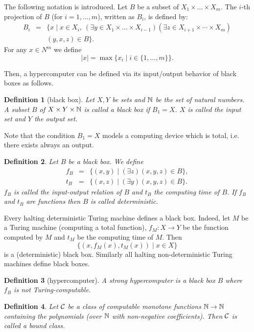 \documentclass[12pt]{article}
\newtheorem{definition}{{\bf Definition} }
\begin{document}
The following  notation is introduced. Let $B$ be a subset of $X_1 \times \ldots
\times X_m$. The $i$-th projection of $B$ (for $i=1,\ldots , m$),
written as $B_i$, is defined by:
%
\[
\begin{array}{lcl}
B_i &=& \{x \mid x \in X_i, \ (\exists y \in X_1 \times \ldots
\times X_{i-1})(\exists z \in X_{i+1} \times \cdots \times X_m)\\
& & (y,x,z) \in B\}.
\end{array}
\]
For any $x \in N^m$ we define
$$|x| = \max\{x_i \mid i \in \{1,\ldots,m\}\}.$$

Then, a hypercomputer can be defined via its input/output behavior of black boxes as follows.

\begin{definition}[black box]\label{def.blackb}
Let $X,Y$ be sets and ${\Bbb N}$ be the set of natural numbers. A subset
$B$ of $X \times Y \times {\Bbb N}$ is called a {\em black box} if $B_1
= X$. $X$ is called the {\em input set} and $Y$ the {\em output
set.}
\end{definition}
Note that the condition $B_1 = X$ models a computing device
which is total, i.e. there exists always an output.
%
\begin{definition}
Let $B$ be a black box. We define
%
\begin{eqnarray*}
f_B &=& \{(x,y) \mid (\exists z)(x,y,z) \in B\},\\[1ex]
%
t_B &=& \{(x,z) \mid (\exists y)(x,y,z) \in B\}.
\end{eqnarray*}
%
$f_B$ is called the {\em input-output relation} of $B$ and $t_B$
the {\em computing time} of $B$. If $f_B$ and $t_B$ are functions
then $B$ is called deterministic.
\end{definition}
Every halting deterministic Turing machine defines a
black box. Indeed, let $M$ be a Turing machine (computing a total
function), $f_M\colon X \to Y$ be the function computed by $M$ and
$t_M$ be the computing time of $M$. Then
$$\{(x,f_M(x),t_M(x)) \mid x \in X\}$$
is a (deterministic) black box. Similarly all halting
non-deterministic Turing machines define black boxes.


\begin{definition}[hypercomputer]\label{def.hyperc}
A {\em strong hypercomputer} is a black box $B$ where $f_B$ is not
Turing-computable.
\end{definition}

\begin{definition}
Let ${\cal C}$ be a class of computable monotone functions ${\Bbb N} \to
{\Bbb N}$ containing the polynomials (over ${\Bbb N}$ with non-negative
coefficients). Then ${\cal C}$ is called a {\em bound class.}
\end{definition}
\end{document}
